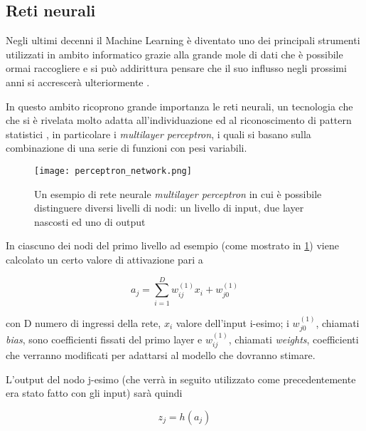 \subsection{Reti neurali}

Negli ultimi decenni il Machine Learning è diventato uno dei principali strumenti utilizzati in 
ambito informatico grazie alla grande mole di dati che è possibile ormai raccogliere e si può 
addirittura pensare che il suo influsso negli prossimi anni si accrescerà ulteriormente \cite{Smola2008}.

In questo ambito ricoprono grande importanza le reti neurali, un tecnologia che che si è rivelata
molto adatta all'individuazione ed al riconoscimento di pattern statistici \cite{bishop2006pattern},
in particolare i \textit{multilayer perceptron}, i quali si basano sulla combinazione di una serie di funzioni con pesi variabili.

\begin{figure}
    \begin{small}
        \begin{center}
            \texttt{[image: perceptron\_network.png]}
        \end{center}
        \caption{Un esempio di rete neurale \textit{multilayer perceptron} in cui è 
            possibile distinguere diversi livelli di nodi: un livello di input, 
            due layer nascosti ed uno di output}
        \label{fig:nn}
    \end{small}
\end{figure}

In ciascuno dei nodi del primo livello ad esempio (come mostrato in \ref{fig:nn}) viene calcolato un certo valore 
di attivazione pari a 

\begin{equation}
    a_j = \sum_{i=1}^{D} w_{ij}^{(1)} x_i + w_{j0}^{(1)}
    \label{eq:node_nn}
\end{equation}

con D numero di ingressi della rete, $x_i$ valore dell'input i-esimo; i $w_{j0}^{(1)}$, chiamati \textit{bias}, sono coefficienti fissati
del primo layer e 
$w_{ij}^{(1)}$, chiamati \textit{weights}, coefficienti che verranno modificati per adattarsi al modello che dovranno stimare.

L'output del nodo j-esimo (che verrà in seguito utilizzato come precedentemente era stato fatto con gli input) sarà quindi
\cite{bishop2006pattern}

\begin{equation}
    z_j = h(a_j)
    \label{eq:activation}
\end{equation}

